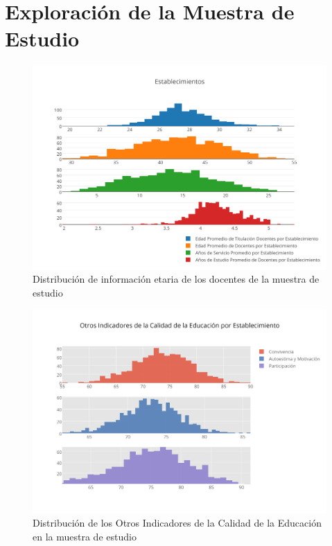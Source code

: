 \section{Exploración de la Muestra de Estudio}
\label{an:explod}

\begin{figure}
  \centering
  \includegraphics[scale=0.8]{Figuras/6SolucionPropuesta/edadespromedio.png}
      \caption{Distribución de información etaria de los docentes de la muestra de estudio}
    \label{fig:came1}
\end{figure}

\begin{figure}
  \centering
  \includegraphics[scale=0.8]{Figuras/6SolucionPropuesta/OIC.png}
      \caption{Distribución de los Otros Indicadores de la Calidad de la Educación en la muestra de estudio}
    \label{fig:came2}
\end{figure}

